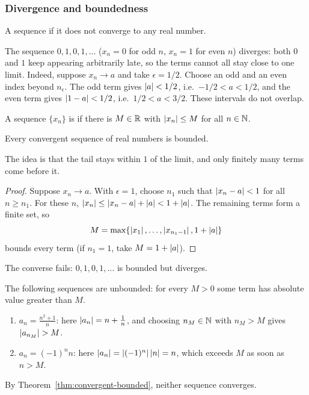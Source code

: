 \subsubsection*{Divergence and boundedness}
\begin{defi}
  A sequence  if it does not converge to any real number.
\end{defi}

\begin{eg}
  The sequence $0, 1, 0, 1, \ldots$ ($x_n = 0$ for odd $n$, $x_n = 1$ for
  even $n$) diverges: both $0$ and $1$ keep appearing arbitrarily late, so the
  terms cannot all stay close to one limit. Indeed, suppose $x_n \to a$ and
  take $\epsilon = 1/2$. Choose an odd and an even index beyond $n_\epsilon$.
  The odd term gives $\left\lvert a\right\rvert < 1/2$, i.e.\ $-1/2 < a < 1/2$, and the even
  term gives $\left\lvert 1 - a\right\rvert < 1/2$, i.e.\ $1/2 < a < 3/2$. These intervals do
  not overlap.
\end{eg}

\begin{defi}
  A sequence $\{x_n\}$ is  if there is $M \in \mathbb{R}$ with
  $\left\lvert x_n\right\rvert \leq M$ for all $n \in \mathbb{N}$.
\end{defi}

\begin{nthm}\label{thm:convergent-bounded}
  Every convergent sequence of real numbers is bounded.
\end{nthm}
The idea is that the tail stays within $1$ of the limit, and only finitely
many terms come before it.

\begin{proof}
  Suppose $x_n \to a$. With $\epsilon = 1$, choose $n_1$ such that
  $\left\lvert x_n - a\right\rvert < 1$ for all $n \geq n_1$. For these $n$,
  $\left\lvert x_n\right\rvert \leq \left\lvert x_n - a\right\rvert + \left\lvert a\right\rvert < 1 + \left\lvert a\right\rvert$. The remaining
  terms form a finite set, so
  \[
    M = \max\{\left\lvert x_1\right\rvert, \ldots, \left\lvert x_{n_1 - 1}\right\rvert, 1 + \left\lvert a\right\rvert\}
  \]
  bounds every term (if $n_1 = 1$, take $M = 1 + \left\lvert a\right\rvert$).
\end{proof}
The converse fails: $0, 1, 0, 1, \ldots$ is bounded but diverges.

\begin{eg}
  The following sequences are unbounded: for every $M > 0$ some term has
  absolute value greater than $M$.
  \begin{enumerate}
    \item $a_n = \frac{n^2 + 1}{n}$: here $\left\lvert a_n\right\rvert = n + \frac{1}{n}$, and
      choosing $n_M \in \mathbb{N}$ with $n_M > M$ gives $\left\lvert a_{n_M}\right\rvert > M$.
    \item $a_n = (-1)^n n$: here $\left\lvert a_n\right\rvert = \left\lvert (-1)^n\right\rvert\left\lvert n\right\rvert = n$, which
      exceeds $M$ as soon as $n > M$.
  \end{enumerate}
  \begin{own}
    By Theorem~\ref{thm:convergent-bounded}, neither sequence converges.
  \end{own}
\end{eg}

